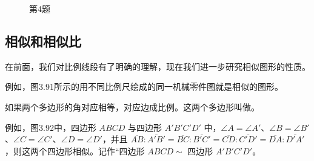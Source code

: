 \begin{figure}
\begin{tikzpicture}
\end{tikzpicture}
    \caption*{第4题}
\end{figure}


\subsection{相似和相似比}
在前面，我们对比例线段有了明确的理解，现在我们进一步研究相似图形的性质。

例如，图3.91所示的用不同比例尺绘成的同一机械零件图就是相似的图形。

\begin{Definition}
如果两个多边形的角对应相等，对应边成比例。这两个多边形叫做。
\end{Definition}

\begin{figure}
    \caption{}
\end{figure}

\begin{figure}
    \begin{tikzpicture}
    \end{tikzpicture}
    \caption{}
\end{figure}

例如，图3.92中，四边形 $ABCD$ 与四边形 $A'B'C'D'$ 中，$\angle A=\angle A'$、$\angle B=\angle B'$、$\angle C=\angle C'$、$\angle D=\angle D'$，并且 $\overline{AB}:\overline{A'B'}=\overline{BC}:\overline{B'C'}=\overline{CD}:\overline{C'D'}=\overline{DA}:\overline{D'A'}$，则这两个四边形相似。记作“四边形 $ABCD\sim$ 四边形 $A'B'C'D'$。

